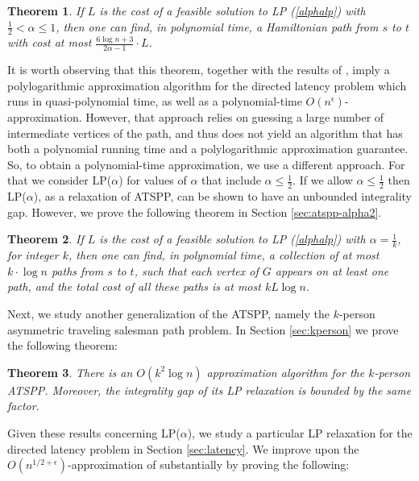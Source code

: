 \documentclass[11pt]{article}
\newtheorem{theorem}{Theorem}[section]
\begin{document}
\begin{theorem}\label{thm:a-ig}
If $L$ is the cost of a feasible solution to LP (\ref{alphalp})
with $\frac{1}{2} < \alpha \leq 1$, then one can find, in polynomial time,
a Hamiltonian path from $s$ to $t$ with  cost at most $\frac{6\log n +3}{2\alpha-1} \cdot L$.
\end{theorem}

It is worth observing that this theorem, together with the results of \cite{nagarajan:ravi:latency}, imply a polylogarithmic approximation algorithm for the directed latency problem which runs in quasi-polynomial time, as well as a polynomial-time $O(n^\epsilon)$-approximation.
However, that approach relies on guessing a large number of intermediate vertices of the path, and thus does not yield an algorithm that has both a polynomial running time and a polylogarithmic approximation guarantee. 
So, to obtain a polynomial-time approximation, we use a different approach. 
For that we consider LP($\alpha$) for values of $\alpha$ that include $\alpha\leq \frac{1}{2}$.
If we allow $\alpha \leq \frac{1}{2}$ then LP($\alpha$),
as a relaxation of ATSPP, can be shown to have an unbounded integrality gap.
However, we prove the following theorem in Section \ref{sec:atspp-alpha2}.


\begin{theorem}\label{thm:kpath}
If $L$ is the cost of a feasible solution to 
LP (\ref{alphalp}) with
$\alpha = \frac{1}{k}$, for integer $k$, then one can find, in polynomial time,
a collection of at most $k\cdot \log n$ paths from $s$ to $t$, such 
that each vertex of $G$ appears on at least one path,
and the total cost of all these paths is at most $kL \log n$.
\end{theorem}

Next, we study another generalization of the ATSPP, namely the $k$-person asymmetric traveling salesman path problem. In Section \ref{sec:kperson} we prove the following theorem:

\begin{theorem}\label{thm:kperson}
There is an $O(k^2 \log n)$ approximation algorithm for the $k$-person ATSPP. 
Moreover, the integrality gap of its LP relaxation is bounded by the same factor.
\end{theorem}

Given these results concerning LP($\alpha$), we study a particular
LP relaxation for the directed latency problem in Section \ref{sec:latency}.
We improve upon the $O(n^{1/2+\epsilon})$-approximation of \cite{nagarajan:ravi:latency} substantially by proving the following:
\end{document}
